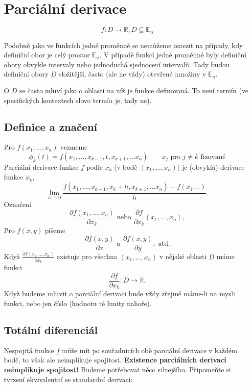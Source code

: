 \documentclass[../main.tex]{subfiles}
\begin{document}
\section{Parciální derivace}

\begin{definition}
	\[f: D \rightarrow \mathbb{R}, D \subseteq \mathbb{E}_n\]
\end{definition}

Podobně jako ve funkcích jedné proměnné se nemůžeme omezit na případy, kdy definiční obor je celý prostor $\mathbb{E}_n$.  
V případě funkcí jedné proměnné byly definiční obory obvykle intervaly nebo jednoduchá sjednocení intervalů. Tady budou definiční
obory $D$ složitější, často (ale ne vždy) otevřené množiny v $\mathbb{E}_n$.

O $D$ se často mluví jako o oblasti na níž je funkce definovaná. To není termín (ve specifických kontextech slovo  termín 
je, tady ne).


\subsection{Definice a značení}
\begin{definition}
	Pro $f(x_1,...,x_n)$ vezmeme 
	\[\phi_k(t) = f(x_1,...,x_{k-1},t,x_{k+1},...x_n) \qquad x_j \text{ pro } j \neq k \text{ fixované}\]
	Parciální derivace funkce $f$ podle $x_k$ (v bodě $(x_1,...,x_n))$ je (obvyklá) derivace funkce $\phi_k$,
	\[\lim_{h\rightarrow 0}\frac{f(x_1,...,x_{k-1},x_k+h,x_{k+1},...x_n) - f(x_1,..)}{h}.\]
	Označení
	\[\frac{\partial f(x_1,...,x_n)}{\partial x_k} \textrm{ nebo } \frac{\partial f}{\partial x_k} (x_1,...,x_n),\]
	Pro $f(x,y)$ píšeme
	\[\frac{\partial f(x,y)}{\partial x} \textrm{ a } \frac{\partial f(x,y)}{\partial y}, \textrm{ atd.}\]
	Když $\frac{\partial f(x_1,...,x_n)}{\partial x_k}$ existuje pro všechna $(x_1,...,x_n)$ v nějaké oblasti $D$ máme funkci
	\[\frac{\partial f}{\partial x_k}: D \rightarrow \mathbb{R}.\]
	Když budeme mluvit o parciální derivaci bude vždy zřejmé máme-li na mysli funkci, nebo jen číslo (hodnotu té limity nahoře).
\end{definition}

\subsection{Totální diferenciál}
Nespojitá funkce $f$ může mít po souřadnicích obě parciální derivace v každém bodě, to však ale neimplikuje spojitost. \textbf{Existence parciálních derivací neimplikuje spojitost!}
Budeme potřebovat něco silnejšího. Připomeňte si tvrzení ekvivalentní se standardní derivací:
\end{document}
